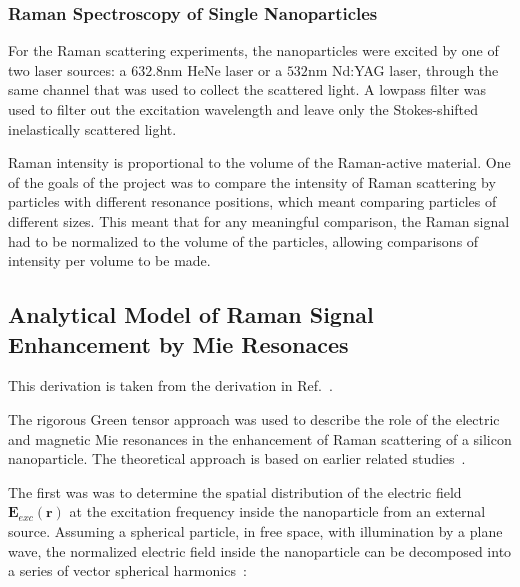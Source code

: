         \subsubsection{Raman Spectroscopy of Single Nanoparticles}
        \label{sec:Raman}
                For the Raman scattering experiments, the nanoparticles were excited by one of two laser sources: a $632.8$nm HeNe laser
            or a $532$nm Nd:YAG laser, through the same channel that was used to collect the scattered light. A lowpass filter was used
            to filter out the excitation wavelength and leave only the Stokes-shifted inelastically scattered light.

                Raman intensity is proportional to the volume of the Raman-active material. One of the goals of the project was to compare
            the intensity of Raman scattering by particles with different resonance positions, which meant comparing particles of different
            sizes. This meant that for any meaningful comparison, the Raman signal had to be normalized to the volume of the particles, allowing
            comparisons of intensity per volume to be made.

    \subsection{Analytical Model of Raman Signal Enhancement by Mie Resonaces}
        \label{sec:Theory}
            This derivation is taken from the derivation in Ref.~\cite{dmitriev2016resonant}.

             The rigorous Green tensor approach was used to describe the role of the electric and magnetic Mie resonances
        in the enhancement of Raman scattering of a silicon nanoparticle. The theoretical approach is based on earlier related
        studies~\cite{canccado2014theory, murphy1983enhanced}.

        The first was was to determine the spatial distribution of the electric field $\mathbf{E}_{exc}(\mathbf{r})$ at the excitation frequency
        inside the nanoparticle from an external source. Assuming a spherical particle, in free space, with illumination by a plane wave,
        the normalized electric field inside the nanoparticle can be decomposed into a series of vector spherical harmonics~\cite{bohren1983absorption}:

